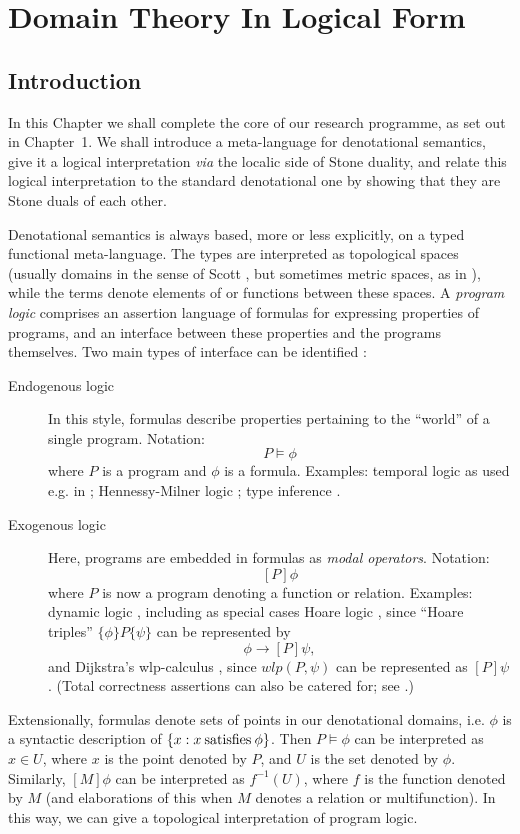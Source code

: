 \chapter{Domain Theory In Logical Form}
\section{Introduction}
In this Chapter we shall complete the core of our 
research programme, as set out in Chapter~1.
We shall introduce a meta-language for denotational semantics,
give it a logical interpretation {\it via} the localic side of Stone duality,
and relate this logical interpretation to the standard denotational one
by showing that they are Stone duals of each other.

Denotational semantics is always based, more or less explicitly,
on a typed functional meta-language.
The types are interpreted as topological spaces
(usually domains in the sense of Scott \cite{Sco81,Sco82}, but
sometimes metric spaces, as in \cite{deBZ82,Niv81}), while the
terms denote elements of or functions between these spaces.
A {\em program logic} comprises an assertion language of formulas
for expressing properties of programs, and an interface between these
properties and the programs themselves.
Two main types of interface can be identified \cite{Pnu77}:
\begin{description}
\item[Endogenous logic] In this style, formulas describe properties
pertaining to the ``world'' of a single program.
Notation: \[ P \models \phi \]
where $P$ is a program and $\phi$ is a formula. Examples:
temporal logic as used e.g. in \cite{Pnu77}; Hennessy-Milner logic \cite{HM85};
type inference \cite{DM82}.
\item[Exogenous logic] Here, programs are embedded in formulas as
{\em modal operators}. Notation: \[ [P]\phi \]
where $P$ is now a program denoting a function or relation.
Examples: dynamic logic \cite{Har79,Pra79}, including as special cases
Hoare logic \cite{Hoa69}, since ``Hoare triples''
$\{ \phi \} P \{ \psi \}$ can be represented by
\[ \phi \rightarrow [P] \psi , \]
and Dijkstra's wlp-calculus \cite{Dij76}, since $wlp( P, \psi )$
can be represented as $[P] \psi$. (Total correctness assertions can also
be catered for; see \cite{Har79}.)
\end{description}

Extensionally, formulas denote sets of points in our denotational
domains, i.e. $\phi$ is a syntactic description of
$\{ x : x \: {\rm satisfies} \: \phi \}$.
Then $P \models \phi$ can be interpreted as $x \in U$, where
$x$ is the point denoted by $P$, and $U$ is the set denoted by 
$\phi$.
Similarly, $[M] \phi$ can be interpreted as $f^{-1}(U)$, where $f$
is the function denoted by $M$ (and elaborations of this when
$M$ denotes a relation or multifunction).
In this way, we can give a topological interpretation of program
logic.

